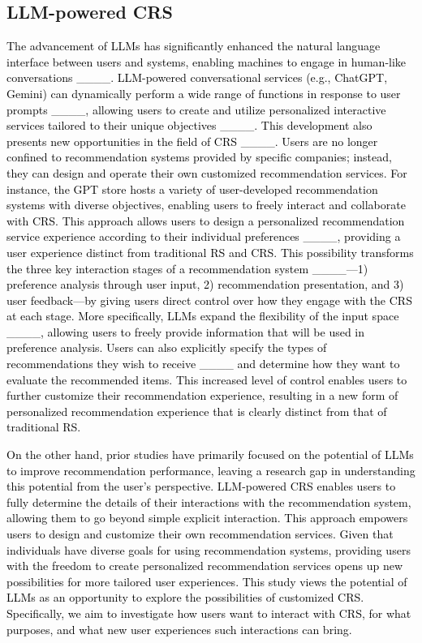 \subsection{LLM-powered CRS}

\textcolor{black}{The advancement of LLMs has significantly enhanced the natural language interface between users and systems, enabling machines to engage in human-like conversations ____. LLM-powered conversational services (e.g., ChatGPT, Gemini) can dynamically perform a wide range of functions in response to user prompts ____, allowing users to create and utilize personalized interactive services tailored to their unique objectives ____. This development also presents new opportunities in the field of CRS ____. Users are no longer confined to recommendation systems provided by specific companies; instead, they can design and operate their own customized recommendation services. For instance, the GPT store hosts a variety of user-developed recommendation systems with diverse objectives, enabling users to freely interact and collaborate with CRS. This approach allows users to design a personalized recommendation service experience according to their individual preferences ____, providing a user experience distinct from traditional RS and CRS. This possibility transforms the three key interaction stages of a recommendation system ____—1) preference analysis through user input, 2) recommendation presentation, and 3) user feedback—by giving users direct control over how they engage with the CRS at each stage. More specifically, LLMs expand the flexibility of the input space ____, allowing users to freely provide information that will be used in preference analysis. Users can also explicitly specify the types of recommendations they wish to receive ____ and determine how they want to evaluate the recommended items. This increased level of control enables users to further customize their recommendation experience, resulting in a new form of personalized recommendation experience that is clearly distinct from that of traditional RS. }

\textcolor{black}{On the other hand, prior studies have primarily focused on the potential of LLMs to improve recommendation performance, leaving a research gap in understanding this potential from the user's perspective. LLM-powered CRS enables users to fully determine the details of their interactions with the recommendation system, allowing them to go beyond simple explicit interaction. This approach empowers users to design and customize their own recommendation services. Given that individuals have diverse goals for using recommendation systems, providing users with the freedom to create personalized recommendation services opens up new possibilities for more tailored user experiences. This study views the potential of LLMs as an opportunity to explore the possibilities of customized CRS. Specifically, we aim to investigate how users want to interact with CRS, for what purposes, and what new user experiences such interactions can bring. }